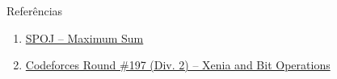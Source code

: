 \begin{frame}[fragile]{Referências}

    \begin{enumerate}
        \item \href{https://www.spoj.com/problems/KGSS/}{SPOJ -- Maximum Sum}

        \item \href{http://codeforces.com/problemset/problem/339/D}{Codeforces Round \#197 (Div. 2) -- Xenia and Bit Operations}
 

    \end{enumerate}

\end{frame}
